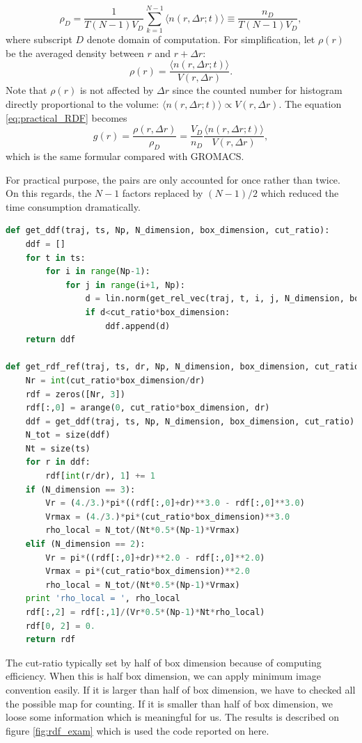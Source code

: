 \documentclass[10pt, a4paper]{article}
\begin{document}
\begin{appendices}
\begin{equation}
    \rho_{D} = \frac{1}{T(N-1)V_D}\sum_{k=1}^{N-1}\langle n(r, \Delta r;t)\rangle \equiv \frac{n_D}{T(N-1)V_D},
  \end{equation}
  where subscript $D$ denote domain of computation. 
  For simplification, let $\rho(r)$ be the averaged density between $r$ and $r+\Delta r$:
  \begin{equation}
    \rho(r) = \frac{\langle n(r, \Delta r; t)\rangle}{V(r, \Delta r)}. %
  \end{equation}
  Note that $\rho(r)$ is not affected by $\Delta r$ since the counted number for histogram directly proportional to the volume: $\langle n(r, \Delta r; t)\rangle \propto V(r, \Delta r)$.
  The equation \eqref{eq:practical_RDF} becomes
  \begin{equation}
    g(r) = \frac{\rho(r, \Delta r)}{\rho_D} = \frac{V_D}{n_D}\frac{\langle n(r, \Delta r; t)\rangle}{V(r, \Delta r)}, \label{eq:practical_RDF_refine}
  \end{equation}
  which is the same formular compared with GROMACS.
  

  For practical purpose, the pairs are only accounted for once rather than twice. On this regards, the $N-1$ factors replaced by $(N-1)/2$ which reduced the time consumption dramatically. 
  \begin{lstlisting}[language=Python,frame=single]
def get_ddf(traj, ts, Np, N_dimension, box_dimension, cut_ratio):
    ddf = []
    for t in ts:
        for i in range(Np-1):
            for j in range(i+1, Np):
                d = lin.norm(get_rel_vec(traj, t, i, j, N_dimension, box_dimension))
                if d<cut_ratio*box_dimension:
                    ddf.append(d)
    return ddf

def get_rdf_ref(traj, ts, dr, Np, N_dimension, box_dimension, cut_ratio):
    Nr = int(cut_ratio*box_dimension/dr)
    rdf = zeros([Nr, 3])
    rdf[:,0] = arange(0, cut_ratio*box_dimension, dr)
    ddf = get_ddf(traj, ts, Np, N_dimension, box_dimension, cut_ratio)
    N_tot = size(ddf)
    Nt = size(ts)
    for r in ddf:
        rdf[int(r/dr), 1] += 1
    if (N_dimension == 3):
        Vr = (4./3.)*pi*((rdf[:,0]+dr)**3.0 - rdf[:,0]**3.0)
        Vrmax = (4./3.)*pi*(cut_ratio*box_dimension)**3.0
        rho_local = N_tot/(Nt*0.5*(Np-1)*Vrmax)
    elif (N_dimension == 2):
        Vr = pi*((rdf[:,0]+dr)**2.0 - rdf[:,0]**2.0)
        Vrmax = pi*(cut_ratio*box_dimension)**2.0
        rho_local = N_tot/(Nt*0.5*(Np-1)*Vrmax)
    print 'rho_local = ', rho_local
    rdf[:,2] = rdf[:,1]/(Vr*0.5*(Np-1)*Nt*rho_local)
    rdf[0, 2] = 0. 
    return rdf
    \end{lstlisting}
    The cut-ratio typically set by half of box dimension because of computing efficiency. When this is half box dimension, we can apply minimum image convention easily. If it is larger than half of box dimension, we have to checked all the possible map for counting. If it is smaller than half of box dimension, we loose some information which is meaningful for us. 
    The results is described on figure \ref{fig:rdf_exam} which is used the code reported on here. 



\end{appendices}
\end{document}
